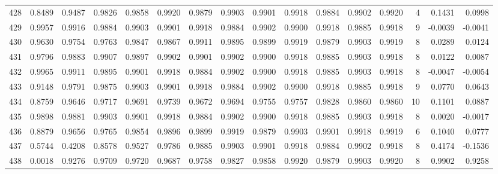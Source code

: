 \begin{tabular}{lrrrrrrrrrrrrrrr}
428 &      0.8489 &  0.9487 &  0.9826 &  0.9858 &  0.9920 &  0.9879 &  0.9903 &  0.9901 &  0.9918 &  0.9884 &   0.9902 &     0.9920 &      4 &                    0.1431 &                     0.0998 \\
429 &      0.9957 &  0.9916 &  0.9884 &  0.9903 &  0.9901 &  0.9918 &  0.9884 &  0.9902 &  0.9900 &  0.9918 &   0.9885 &     0.9918 &      9 &                   -0.0039 &                    -0.0041 \\
430 &      0.9630 &  0.9754 &  0.9763 &  0.9847 &  0.9867 &  0.9911 &  0.9895 &  0.9899 &  0.9919 &  0.9879 &   0.9903 &     0.9919 &      8 &                    0.0289 &                     0.0124 \\
431 &      0.9796 &  0.9883 &  0.9907 &  0.9897 &  0.9902 &  0.9901 &  0.9902 &  0.9900 &  0.9918 &  0.9885 &   0.9903 &     0.9918 &      8 &                    0.0122 &                     0.0087 \\
432 &      0.9965 &  0.9911 &  0.9895 &  0.9901 &  0.9918 &  0.9884 &  0.9902 &  0.9900 &  0.9918 &  0.9885 &   0.9903 &     0.9918 &      8 &                   -0.0047 &                    -0.0054 \\
433 &      0.9148 &  0.9791 &  0.9875 &  0.9903 &  0.9901 &  0.9918 &  0.9884 &  0.9902 &  0.9900 &  0.9918 &   0.9885 &     0.9918 &      9 &                    0.0770 &                     0.0643 \\
434 &      0.8759 &  0.9646 &  0.9717 &  0.9691 &  0.9739 &  0.9672 &  0.9694 &  0.9755 &  0.9757 &  0.9828 &   0.9860 &     0.9860 &     10 &                    0.1101 &                     0.0887 \\
435 &      0.9898 &  0.9881 &  0.9903 &  0.9901 &  0.9918 &  0.9884 &  0.9902 &  0.9900 &  0.9918 &  0.9885 &   0.9903 &     0.9918 &      8 &                    0.0020 &                    -0.0017 \\
436 &      0.8879 &  0.9656 &  0.9765 &  0.9854 &  0.9896 &  0.9899 &  0.9919 &  0.9879 &  0.9903 &  0.9901 &   0.9918 &     0.9919 &      6 &                    0.1040 &                     0.0777 \\
437 &      0.5744 &  0.4208 &  0.8578 &  0.9527 &  0.9786 &  0.9885 &  0.9903 &  0.9901 &  0.9918 &  0.9884 &   0.9902 &     0.9918 &      8 &                    0.4174 &                    -0.1536 \\
438 &      0.0018 &  0.9276 &  0.9709 &  0.9720 &  0.9687 &  0.9758 &  0.9827 &  0.9858 &  0.9920 &  0.9879 &   0.9903 &     0.9920 &      8 &                    0.9902 &                     0.9258 \\

\end{tabular}
